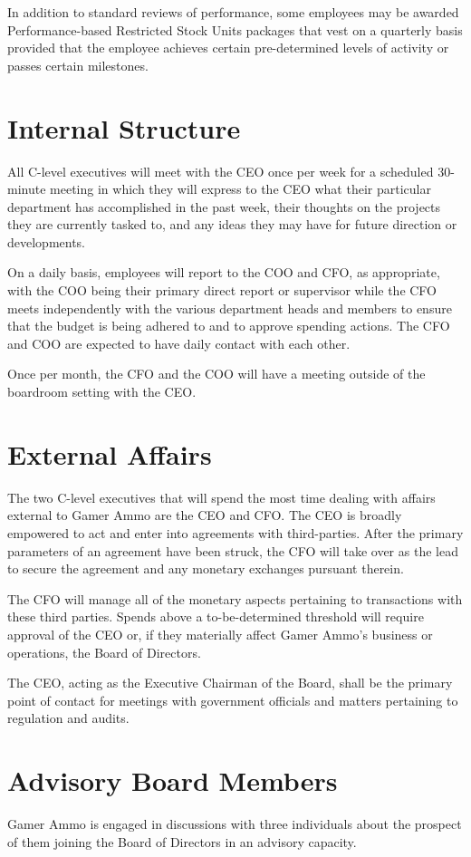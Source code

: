 \documentclass[11pt]{report}
\begin{document}
In addition to standard reviews of performance, some employees may be awarded Performance-based Restricted Stock Units packages that vest on a quarterly basis provided that the employee achieves certain pre-determined levels of activity or passes certain milestones.

\section{Internal Structure}
All C-level executives will meet with the CEO once per week for a scheduled 30-minute meeting in which they will express to the CEO what their particular department has accomplished in the past week, their thoughts on the projects they are currently tasked to, and any ideas they may have for future direction or developments.

On a daily basis, employees will report to the COO and CFO, as appropriate, with the COO being their primary direct report or supervisor while the CFO meets independently with the various department heads and members to ensure that the budget is being adhered to and to approve spending actions. The CFO and COO are expected to have daily contact with each other.

Once per month, the CFO and the COO will have a meeting outside of the boardroom setting with the CEO.
\section{External Affairs}
The two C-level executives that will spend the most time dealing with affairs external to Gamer Ammo are the CEO and CFO. The CEO is broadly empowered to act and enter into agreements with third-parties. After the primary parameters of an agreement have been struck, the CFO will take over as the lead to secure the agreement and any monetary exchanges pursuant therein.

The CFO will manage all of the monetary aspects pertaining to transactions with these third parties. Spends above a to-be-determined threshold will require approval of the CEO or, if they materially affect Gamer Ammo's business or operations, the Board of Directors.

The CEO, acting as the Executive Chairman of the Board, shall be the primary point of contact for meetings with government officials and matters pertaining to regulation and audits.

\section{Advisory Board Members}
Gamer Ammo is engaged in discussions with three individuals about the prospect of them joining the Board of Directors in an advisory capacity.
\end{document}

